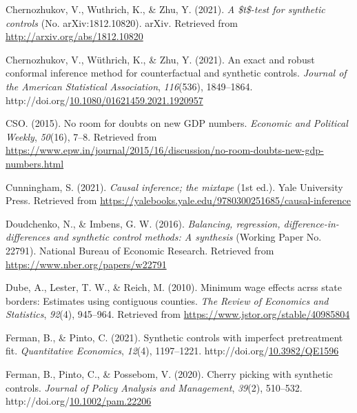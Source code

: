 \documentclass[12pt,nobind, a4paper]{reedthesis}
\newlength{\cslhangindent}
\newenvironment{CSLReferences}[2] %
{%
	\setlength{\parindent}{0pt}
	\ifodd #1 \everypar{\setlength{\hangindent}{\cslhangindent}}\ignorespaces\fi
	\ifnum #2 > 0
	\setlength{\parskip}{#2\baselineskip}
	\fi
}%
{}
\begin{document}
\begin{CSLReferences}{1}{0}
 \leavevmode{}%
 Chernozhukov, V., Wuthrich, K., \& Zhu, Y. (2021). \emph{A \$t\$-test for synthetic controls} (No. {arXiv}:1812.10820). {arXiv}. Retrieved from \url{http://arxiv.org/abs/1812.10820}

 \leavevmode{}%
 Chernozhukov, V., Wüthrich, K., \& Zhu, Y. (2021). An exact and robust conformal inference method for counterfactual and synthetic controls. \emph{Journal of the American Statistical Association}, \emph{116}(536), 1849--1864. http://doi.org/\href{https://doi.org/10.1080/01621459.2021.1920957}{10.1080/01621459.2021.1920957}

 \leavevmode{}%
 CSO. (2015). No room for doubts on new {GDP} numbers. \emph{Economic and Political Weekly}, \emph{50}(16), 7--8. Retrieved from \url{https://www.epw.in/journal/2015/16/discussion/no-room-doubts-new-gdp-numbers.html}

 \leavevmode{}%
 Cunningham, S. (2021). \emph{Causal inference; the mixtape} (1st ed.). Yale University Press. Retrieved from \url{https://yalebooks.yale.edu/9780300251685/causal-inference}

 \leavevmode{}%
 Doudchenko, N., \& Imbens, G. W. (2016). \emph{Balancing, regression, difference-in-differences and synthetic control methods: A synthesis} (Working Paper No. 22791). National Bureau of Economic Research. Retrieved from \url{https://www.nber.org/papers/w22791}

 \leavevmode{}%
 Dube, A., Lester, T. W., \& Reich, M. (2010). Minimum wage effects acrss state borders: Estimates using contiguous counties. \emph{The Review of Economics and Statistics}, \emph{92}(4), 945--964. Retrieved from \url{https://www.jstor.org/stable/40985804}

 \leavevmode{}%
 Ferman, B., \& Pinto, C. (2021). Synthetic controls with imperfect pretreatment fit. \emph{Quantitative Economics}, \emph{12}(4), 1197--1221. http://doi.org/\href{https://doi.org/10.3982/QE1596}{10.3982/QE1596}

 \leavevmode{}%
 Ferman, B., Pinto, C., \& Possebom, V. (2020). Cherry picking with synthetic controls. \emph{Journal of Policy Analysis and Management}, \emph{39}(2), 510--532. http://doi.org/\href{https://doi.org/10.1002/pam.22206}{10.1002/pam.22206}


\end{CSLReferences}
\end{document}
